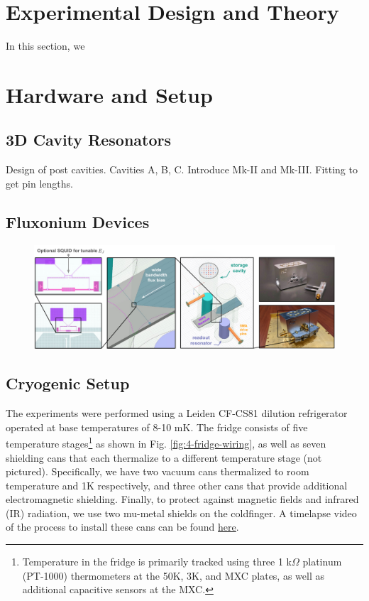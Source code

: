 \section{Experimental Design and Theory}

In this section, we 



\section{Hardware and Setup}

\subsection{3D Cavity Resonators \label{sec:4_3D_Cavity_Resonators}}

Design of post cavities. Cavities A, B, C. Introduce Mk-II and Mk-III. Fitting to get pin lengths. 

\subsection{Fluxonium Devices}


\begin{figure}[h]
    \centering
    \includegraphics[width=\linewidth]{Figures/4/3DGKP-Schematic.pdf}
    \caption{}
    \label{fig:4-3DGKP-schematic}
\end{figure}



\subsection{Cryogenic Setup}

The experiments were performed using a Leiden CF-CS81 dilution refrigerator operated at base temperatures of 8-10 mK. The fridge consists of five temperature stages\footnote{Temperature in the fridge is primarily tracked using three 1 k$\Omega$ platinum (PT-1000) thermometers at the 50K, 3K, and MXC plates, as well as additional capacitive sensors at the MXC. } as shown in Fig. \ref{fig:4-fridge-wiring}, as well as seven shielding cans that each thermalize to a different temperature stage (not pictured). Specifically, we have two vacuum cans thermalized to room temperature and 1K respectively, and three other cans that provide additional electromagnetic shielding. Finally, to protect against magnetic fields and infrared (IR) radiation, we use two mu-metal shields  on the coldfinger. A timelapse video of the process to install these cans can be found \href{https://youtu.be/KkvUc9Aw77s?t=829}{here}. 

